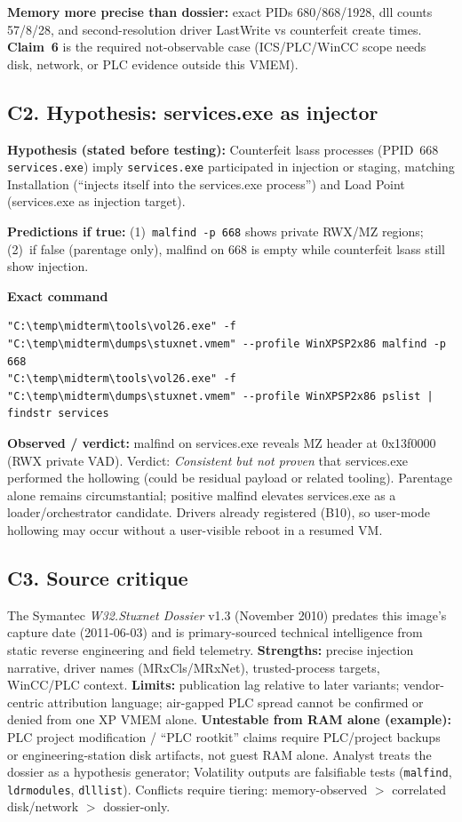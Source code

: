 \documentclass[11pt,letterpaper]{article}
\begin{document}
\noindent\textbf{Memory more precise than dossier:} exact PIDs 680/868/1928, dll counts 57/8/28, and second-resolution
driver LastWrite vs counterfeit create times. \textbf{Claim~6} is the required not-observable case (ICS/PLC/WinCC
scope needs disk, network, or PLC evidence outside this VMEM).

\subsection*{C2. Hypothesis: services.exe as injector}
\textbf{Hypothesis (stated before testing):} Counterfeit lsass processes (PPID~668 \texttt{services.exe}) imply
\texttt{services.exe} participated in injection or staging, matching Installation (``injects itself into the services.exe process'')
and Load Point (services.exe as injection target).

\textbf{Predictions if true:} (1)~\texttt{malfind -p 668} shows private RWX/MZ regions;
(2)~if false (parentage only), malfind on 668 is empty while counterfeit lsass still show injection.

\noindent\textbf{Exact command}
\begin{lstlisting}
"C:\temp\midterm\tools\vol26.exe" -f "C:\temp\midterm\dumps\stuxnet.vmem" --profile WinXPSP2x86 malfind -p 668
"C:\temp\midterm\tools\vol26.exe" -f "C:\temp\midterm\dumps\stuxnet.vmem" --profile WinXPSP2x86 pslist | findstr services
\end{lstlisting}
\noindent\textbf{Observed / verdict:} malfind on services.exe reveals MZ header at 0x13f0000 (RWX private VAD).
Verdict: \textit{Consistent but not proven} that services.exe performed the hollowing (could be residual payload
or related tooling). Parentage alone remains circumstantial; positive malfind elevates services.exe as a
loader/orchestrator candidate. Drivers already registered (B10), so user-mode hollowing may occur without a
user-visible reboot in a resumed VM.

\subsection*{C3. Source critique}
The Symantec \textit{W32.Stuxnet Dossier} v1.3 (November 2010) predates this image's capture date (2011-06-03)
and is primary-sourced technical intelligence from static reverse engineering and field telemetry.
\textbf{Strengths:} precise injection narrative, driver names (MRxCls/MRxNet), trusted-process targets, WinCC/PLC context.
\textbf{Limits:} publication lag relative to later variants; vendor-centric attribution language; air-gapped PLC spread
cannot be confirmed or denied from one XP VMEM alone.
\textbf{Untestable from RAM alone (example):} PLC project modification / ``PLC rootkit'' claims require PLC/project
backups or engineering-station disk artifacts, not guest RAM alone.
Analyst treats the dossier as a hypothesis generator; Volatility outputs are falsifiable tests
(\texttt{malfind}, \texttt{ldrmodules}, \texttt{dlllist}). Conflicts require tiering: memory-observed $>$ correlated disk/network $>$ dossier-only.
\end{document}
